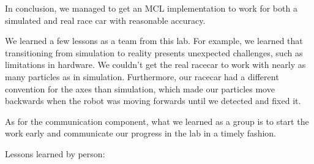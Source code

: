 \documentclass[11pt,twocolumn]{article}
\begin{document}

In conclusion, we managed to get an MCL implementation to work for both a simulated and real race car with reasonable accuracy.

We learned a few lessons as a team from this lab. For example, we learned that transitioning from simulation to reality presents unexpected challenges, such as limitations in hardware. We couldn't get the real racecar to work with nearly as many particles as in simulation. Furthermore, our racecar had a different convention for the axes than simulation, which made our particles move backwards when the robot was moving forwards until we detected and fixed it.

As for the communication component, what we learned as a group is to start the work early and communicate our progress in the lab in a timely fashion. 

Lessons learned by person:
\end{document}
